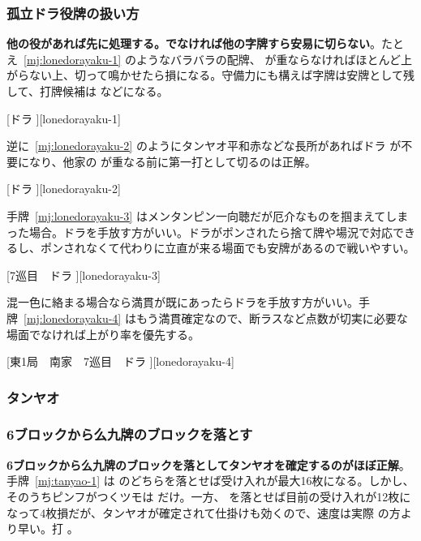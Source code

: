 \documentclass[../nankiru_main.tex]{subfiles}
\begin{document}
\subsubsection*{孤立ドラ役牌の扱い方}

\textbf{他の役があれば先に処理する。でなければ他の字牌すら安易に切らない}\citep{yoteru-lonedorayakuhai}。たとえ~\ref{mj:lonedorayaku-1} のようなバラバラの配牌、 が重ならなければほとんど上がらない上、切って鳴かせたら損になる。守備力にも構えば字牌は安牌として残して、打牌候補は  などになる。

[ドラ ][lonedorayaku-1]

逆に~\ref{mj:lonedorayaku-2} のようにタンヤオ平和赤などな長所があればドラ  が不要になり、他家の  が重なる前に第一打として切るのは正解。

[ドラ ][lonedorayaku-2]

手牌~\ref{mj:lonedorayaku-3} はメンタンピン一向聴だが厄介なものを掴まえてしまった場合。ドラを手放す方がいい。ドラがポンされたら捨て牌や場況で対応できるし、ポンされなくて代わりに立直が来る場面でも安牌があるので戦いやすい。

[7巡目　ドラ ][lonedorayaku-3]

混一色に絡まる場合なら満貫が既にあったらドラを手放す方がいい。手牌~\ref{mj:lonedorayaku-4} はもう満貫確定なので、断ラスなど点数が切実に必要な場面でなければ上がり率を優先する。

[東1局　南家　7巡目　ドラ ][lonedorayaku-4]


\subsubsection{タンヤオ}

\subsubsection*{6ブロックから么九牌のブロックを落とす}

\textbf{6ブロックから么九牌のブロックを落としてタンヤオを確定するのがほぼ正解}。手牌~\ref{mj:tanyao-1} は  のどちらを落とせば受け入れが最大16枚になる。しかし、そのうちピンフがつくツモは  だけ。一方、 を落とせば目前の受け入れが12枚になって4枚損だが、タンヤオが確定されて仕掛けも効くので、速度は実際  の方より早い。打 。
\end{document}

